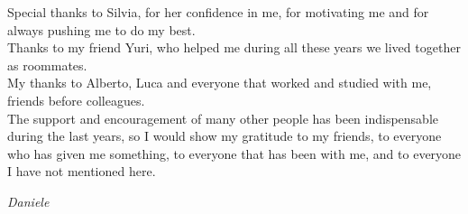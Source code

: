 Special thanks to Silvia, for her confidence in me, for motivating me and for always pushing me to do my best.\\

Thanks to my friend Yuri, who helped me during all these years we lived together as roommates.\\

My thanks to Alberto, Luca and everyone that worked and studied with me, friends before colleagues.\\

The support and encouragement of many other people has been indispensable during the last years, so I would show my gratitude to my friends, to everyone who has given me something, to everyone that has been with me, and to everyone I have not mentioned here.\\

\begin{flushright}
\textit{Daniele}
\end{flushright}

 

